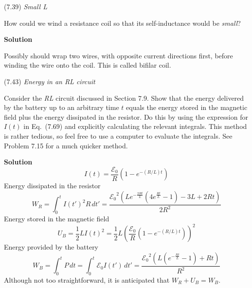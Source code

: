 \documentclass{article}
\begin{document}

\begin{homeworkProblem}
	(7.39) \textit{Small L}

	How could we wind a resistance coil so that its self-inductance would be \textit{small}?

	\textbf{Solution}

	Possibly should wrap two wires, with opposite current directions first, before winding the wire onto the coil. This is called bifilar coil.
\end{homeworkProblem}


\begin{homeworkProblem}
	(7.43) \textit{Energy in an RL circuit}

	Consider the \textit{RL} circuit discussed in Section 7.9. Show that the energy delivered by the battery up to an arbitrary time $t$ equals the energy stored in the magnetic field plus the energy dissipated in the resistor. Do this by using the expression for $I(t)$ in Eq.~(7.69) and explicitly calculating the relevant integrals. This method is rather tedious, so feel free to use a computer to evaluate the integrals. See Problem 7.15 for a much quicker method.

	\textbf{Solution}
	\begin{equation}\tag{7.69}
		I(t)=\frac{\mathcal{E}_0}{R}{\left(1-e^{-(R/L)t}\right)}
	\end{equation}
	Energy dissipated in the resistor
	\[
		W_R=\int_0^t {I(t')}^2R\,dt'=\frac{{\mathcal{E}_0}^2 \left(L e^{-\frac{2 R t}{L}} \left(4 e^{\frac{R t}{L}}-1\right)-3 L+2 R t\right)}{2 R^2}
	\]
	Energy stored in the magnetic field
	\[
		U_B=\frac{1}{2}L{I(t)}^2=\frac{1}{2}L{\left(\frac{\mathcal{E}_0}{R}{\left(1-e^{-(R/L)t}\right)}\right)}^2
	\]
	Energy provided by the battery
	\[
		W_B=\int_0^t P\,dt=\int_0^t \mathcal{E}_0I(t')\,dt'=\frac{{\mathcal{E}_0}^2 \left(L \left(e^{-\frac{R t}{L}}-1\right)+R t\right)}{R^2}
	\]
	Although not too straightforward, it is anticipated that $W_R+U_B=W_B$.
\end{homeworkProblem}
\end{document}

